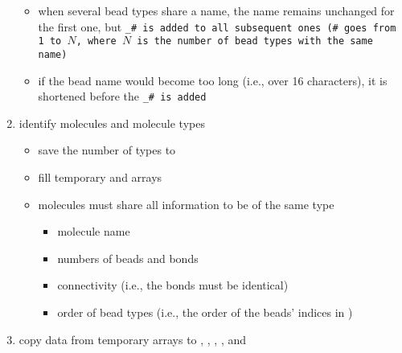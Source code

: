 \begin{enumerate}
    \begin{itemize}
      \item when several bead types share a name, the name remains unchanged for
        the first one, but \tt{_\#} is added to all subsequent ones (\tt{\#}
        goes from 1 to $N$, where $N$ is the number of bead types with the same
        name)
      \item if the bead name would become too long (i.e., over 16 characters),
        it is shortened before the \tt{_\#} is added
    \end{itemize}
  \item identify molecules and molecule types
    \begin{itemize}
      \item save the number of types to 
      \item fill temporary  and
         arrays
      \item molecules must share all information to be of the same type
        \begin{itemize}
          \item molecule name
          \item numbers of beads and bonds
          \item connectivity (i.e., the bonds must be identical)
          \item order of bead types (i.e., the order of the beads' indices in
            )
        \end{itemize}
    \end{itemize}
  \item copy data from temporary arrays to , ,
    , , and 
\end{enumerate}
